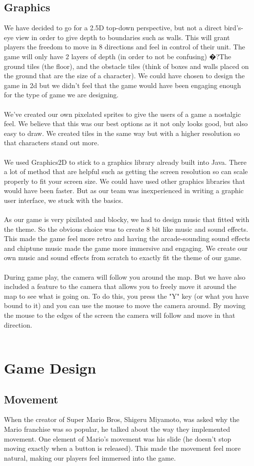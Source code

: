 \documentclass[12pt]{article}
\newcommand{\return}{\\\\\noindent}
\begin{document}
\subsection{Graphics}
We have decided to go for a 2.5D top-down perspective, but not a direct bird's-eye view in order to give depth to boundaries such as walls. This will grant players the freedom to move in 8 directions and feel in control of their unit. The game will only have 2 layers of depth (in order to not be confusing) �?The ground tiles (the floor), and the obstacle tiles (think of boxes and walls placed on the ground that are the size of a character). We could have chosen to design the game in 2d but we didn't feel that the game would have been engaging enough for the type of game we are designing.\return
We've created our own pixelated sprites to give the users of a game a nostalgic feel. We believe that this was our best options as it not only looks good, but also easy to draw. We created tiles in the same way but with a higher resolution so that characters stand out more.\return
We used Graphics2D to stick to a graphics library already built into Java. There a lot of method that are helpful such as getting the screen resolution so can scale properly to fit your screen size. We could have used other graphics libraries that would have been faster. But as our team was inexperienced in writing a graphic user interface, we stuck with the basics.\return
As our game is very pixilated and blocky, we had to design music that fitted with the theme. So the obvious choice was to create 8 bit like music and sound effects. This made the game feel more retro and having the arcade-sounding sound effects and chiptune music made the game more immersive and engaging. We create our own music and sound effects from scratch to exactly fit the theme of our game.\return
During game play, the camera will follow you around the map. But we have also included a feature to the camera that allows you to freely move it around the map to see what is going on. To do this, you press the "Y" key (or what you have bound to it) and you can use the mouse to move the camera around. By moving the mouse to the edges of the screen the camera will follow and move in that direction.\return
\newpage
\section{Game Design}
\subsection{Movement}
When the creator of Super Mario Bros, Shigeru Miyamoto, was asked why the Mario franchise was so popular, he talked about the way they implemented movement. One element of Mario’s movement was his slide (he doesn’t stop moving exactly when a button is released). This made the movement feel more natural, making our players feel immersed into the game.
\end{document}
